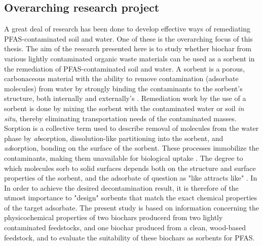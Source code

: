 \subsection{Overarching research project}
A great deal of research has been done to develop effective ways of remediating PFAS-contaminated soil and water. One of these is the overarching focus of this thesis. The aim of the research presented here is to study whether biochar from various lightly contaminated organic waste materials can be used as a sorbent in the remediation of PFAS-contaminated soil and water. A sorbent is a porous, carbonaceous material with the ability to remove contamination (adsorbate molecules) from water by strongly binding the contaminants to the sorbent's structure, both internally and externally's \citep{LehmannAndJoseph2015}. Remediation work by the use of a sorbent is done by mixing the sorbent with the contaminated water or soil \textit{in situ}, thereby eliminating transportation needs of the contaminated masses. Sorption is a collective term used to describe removal of molecules from the water phase by \textit{ab}sorption, dissolution-like partitioning into the sorbent, and \textit{ad}sorption, bonding on the surface of the sorbent. These processes immobilize the contaminants, making them unavailable for biological uptake \citep{crccare2017assessment}. The degree to which molecules sorb to solid surfaces depends both on the structure and surface properties of the sorbent, and the adsorbate of question as "like attracts like" \citep{ball2012like}. In In order to achieve the desired decontamination result, it is therefore of the utmost importance to "design" sorbents that match the exact chemical properties of the target adsorbate. The present study is based on information concerning the physicochemical properties of two biochars producerd from two lightly contaminated feedstocks, and one biochar produced from a clean, wood-based feedstock, and to evaluate the suitability of these biochars as sorbents for PFAS.

